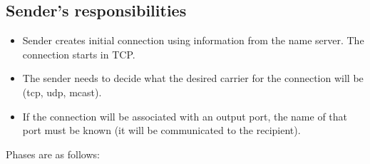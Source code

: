 



\subsection{Sender's responsibilities}

\begin{itemize}

\item Sender creates initial connection using information 
from the name server.  The connection starts in TCP.

\item The sender needs to decide what the desired carrier
for the connection will be (tcp, udp, mcast).

\item If the connection will be associated with an output port, the
name of that port must be known (it will be communicated to the
recipient).

\end{itemize}

Phases are as follows:

